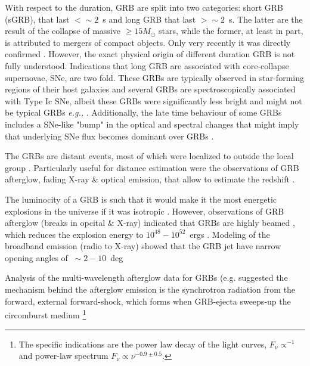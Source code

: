 \documentclass[11pt,a4paper,headinclude=true,DIV=14,BCOR=8mm,chapterprefix,listof=totoc,twoside,openright,abstracton]{scrbook}
\begin{document}
With respect to the duration, GRB are split into two categories: short GRB (sGRB), that last $< \sim 2$~s and long GRB that last $> \sim 2$~s. The latter are the result of the collapse of massive $\geq 15M_{\odot}$ stars, while the former, at least in part, is attributed to mergers of compact objects. Only very recently it was directly confirmed \cite{Abott+2017}. However, the exact physical origin of different duration GRB is not fully understood.
Indications that long GRB are associated with core-collapse supernovae, SNe, are two fold. These GRBs are typically observed in star-forming regions of their host galaxies \cite{(e.g. Bloom et al., 2002b; Fruchter et al., 2006; Christensen et al., 2004; Castro Ceron et al., 2006);} and several GRBs are spectroscopically associated with Type Ic SNe, albeit these GRBs were significantly less bright and might not be typical GRBs \textit{e.g.,} \cite{Liang et al., 2007a; Bromberg et al., 2011a}. Additionally, the late time behaviour of some GRBs includes a SNe-like "bump" in the optical and spectral changes that might imply that underlying SNe flux becomes dominant over GRBs \cite{(Bloom et al., 1999; Woosley and Bloom, 2006)}.

The GRBs are distant events, most of which were localized to outside the local group \cite{Mao and Paczynski, 1992; Piran, 1992; Fenimore et al., 1993}. Particularly useful for distance estimation were the observations of GRB afterglow, fading X-ray \& optical emission, that allow to estimate the redshift \cite{Costa et al., 1997; Frontera et al., 1998; van Paradijs et al., 1997}.

The luminocity of a GRB is such that it would make it the most energetic explosions in the universe if it was isotropic \cite{Kulkarni et al., 1999a}. However, observations of GRB afterglow (breaks in opcital \& X-ray) indicated that GRBs are highly beamed \cite{Rhoads, 1999; Sari et al., 1999}, which reduces the explosion energy to $10^{48}-10^{52}$~ergs \cite{Frail et al., 2001; Panaitescu and Kumar, 2001; Berger et al., 2003a; Curran et al., 2008; Liang et al., 2008a; Racusin et al., 2009; Cenko et al., 2010}.
Modeling of the broadband emission (radio to X-ray) showed that the GRB jet have narrow opening angles of $~\sim 2-10$~deg \cite{Rhoads, 1999; Sari et al., 1999; Frail et al., 2001; Panaitescu and Kumar, 2001; Berger et al., 2003a; Cenko et al., 2010}

Analysis of the multi-wavelength afterglow data for GRBs (e.g.\cite{Panaitescu and Kumar, 2002)} suggested the mechanism behind the afterglow emission is the synchrotron radiation from the forward,  external forward-shock, which forms when GRB-ejecta sweeps-up the circomburst medium
\footnote{The specific indications are the power law decay of the light curves, $F_{\nu}\propto^{-1}$ and power-law spectrum $F_{\nu}\propto\nu^{-0.9\pm 0.5}$.} 
\cite{(Rees and Meszaros, 1992; Paczynski and Rhoads, 1993; Meszaros and Rees, 1993, 1997a)}
\end{document}
